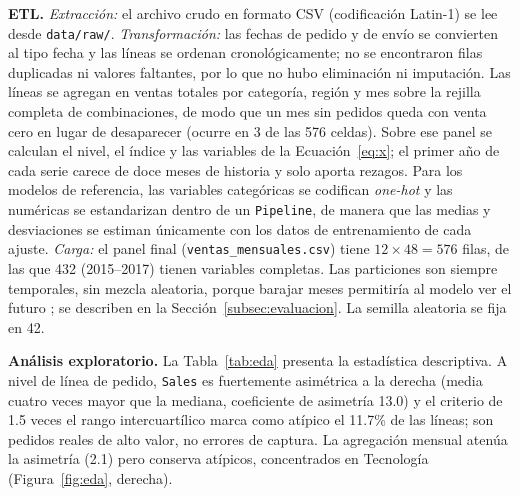 \documentclass[pdflatex,sn-mathphys-num]{sn-jnl}
\begin{document}
\textbf{ETL.} \textit{Extracción:} el archivo crudo en formato CSV (codificación Latin-1) se lee desde \texttt{data/raw/}. \textit{Transformación:} las fechas de pedido y de envío se convierten al tipo fecha y las líneas se ordenan cronológicamente; no se encontraron filas duplicadas ni valores faltantes, por lo que no hubo eliminación ni imputación. Las líneas se agregan en ventas totales por categoría, región y mes sobre la rejilla completa de combinaciones, de modo que un mes sin pedidos queda con venta cero en lugar de desaparecer (ocurre en 3 de las 576 celdas). Sobre ese panel se calculan el nivel, el índice y las variables de la Ecuación~\eqref{eq:x}; el primer año de cada serie carece de doce meses de historia y solo aporta rezagos. Para los modelos de referencia, las variables categóricas se codifican \emph{one-hot} y las numéricas se estandarizan dentro de un \texttt{Pipeline}, de manera que las medias y desviaciones se estiman únicamente con los datos de entrenamiento de cada ajuste. \textit{Carga:} el panel final (\texttt{ventas\_mensuales.csv}) tiene $12\times48=576$ filas, de las que 432 (2015--2017) tienen variables completas. Las particiones son siempre temporales, sin mezcla aleatoria, porque barajar meses permitiría al modelo ver el futuro \cite{bergmeir2018,cerqueira2020}; se describen en la Sección~\ref{subsec:evaluacion}. La semilla aleatoria se fija en 42.

\textbf{Análisis exploratorio.} La Tabla~\ref{tab:eda} presenta la estadística descriptiva. A nivel de línea de pedido, \texttt{Sales} es fuertemente asimétrica a la derecha (media cuatro veces mayor que la mediana, coeficiente de asimetría 13.0) y el criterio de 1.5 veces el rango intercuartílico marca como atípico el 11.7\% de las líneas; son pedidos reales de alto valor, no errores de captura. La agregación mensual atenúa la asimetría (2.1) pero conserva atípicos, concentrados en Tecnología (Figura~\ref{fig:eda}, derecha).
\end{document}
